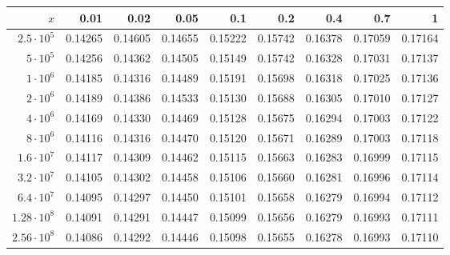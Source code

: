 \begin{tabular}{@{}rrrrrrrrr@{}}
\toprule
$x$ & 0.01 & 0.02 & 0.05 & 0.1 & 0.2 & 0.4 & 0.7 & 1 \\
\midrule
$2.5\cdot10^{5}$ & 0.14265 & 0.14605 & 0.14655 & 0.15222 & 0.15742 & 0.16378 & 0.17059 & 0.17164 \\
$5\cdot10^{5}$ & 0.14256 & 0.14362 & 0.14505 & 0.15149 & 0.15742 & 0.16328 & 0.17031 & 0.17137 \\
$1\cdot10^{6}$ & 0.14185 & 0.14316 & 0.14489 & 0.15191 & 0.15698 & 0.16318 & 0.17025 & 0.17136 \\
$2\cdot10^{6}$ & 0.14189 & 0.14386 & 0.14533 & 0.15130 & 0.15688 & 0.16305 & 0.17010 & 0.17127 \\
$4\cdot10^{6}$ & 0.14169 & 0.14330 & 0.14469 & 0.15128 & 0.15675 & 0.16294 & 0.17003 & 0.17122 \\
$8\cdot10^{6}$ & 0.14116 & 0.14316 & 0.14470 & 0.15120 & 0.15671 & 0.16289 & 0.17003 & 0.17118 \\
$1.6\cdot10^{7}$ & 0.14117 & 0.14309 & 0.14462 & 0.15115 & 0.15663 & 0.16283 & 0.16999 & 0.17115 \\
$3.2\cdot10^{7}$ & 0.14105 & 0.14302 & 0.14458 & 0.15106 & 0.15660 & 0.16281 & 0.16996 & 0.17114 \\
$6.4\cdot10^{7}$ & 0.14095 & 0.14297 & 0.14450 & 0.15101 & 0.15658 & 0.16279 & 0.16994 & 0.17112 \\
$1.28\cdot10^{8}$ & 0.14091 & 0.14291 & 0.14447 & 0.15099 & 0.15656 & 0.16279 & 0.16993 & 0.17111 \\
$2.56\cdot10^{8}$ & 0.14086 & 0.14292 & 0.14446 & 0.15098 & 0.15655 & 0.16278 & 0.16993 & 0.17110 \\
\bottomrule
\end{tabular}
